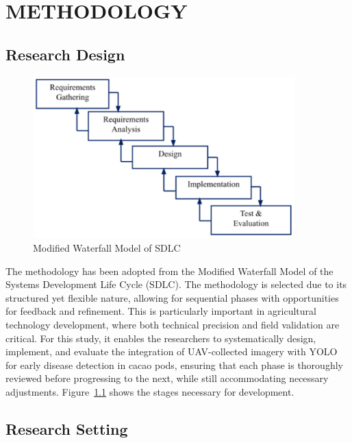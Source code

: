 \chapter{METHODOLOGY}

\section{Research Design}
\begin{figure}[H]
	\centering
	\caption{Modified Waterfall Model of SDLC}
	\label{fig:waterfall}
	\includegraphics[width=0.9\textwidth]{figures/Waterfall.pdf}
\end{figure}

The methodology has been adopted from the Modified Waterfall Model of the Systems Development Life Cycle (SDLC). The methodology is selected due to its structured yet flexible nature, allowing for sequential phases with opportunities for feedback and refinement. This is particularly important in agricultural technology development, where both technical precision and field validation are critical. For this study, it enables the researchers to systematically design, implement, and evaluate the integration of UAV-collected imagery with YOLO for early disease detection in cacao pods, ensuring that each phase is thoroughly reviewed before progressing to the next, while still accommodating necessary adjustments. Figure~\ref{fig:waterfall}  shows the stages necessary for development.

\section{Research Setting}

